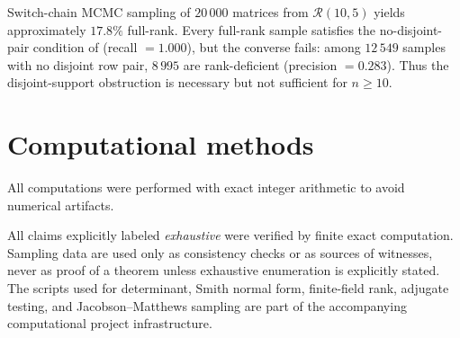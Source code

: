 \documentclass[11pt,a4paper]{article}
\begin{document}
\begin{remark}[Converse failure at $n=10$]\label{rem:n10-converse}
Switch-chain MCMC sampling of $20\,000$ matrices from $\mathcal{R}(10,5)$
yields approximately $17.8\%$ full-rank.  Every full-rank sample satisfies
the no-disjoint-pair condition of  (recall
$=1.000$), but the converse fails: among $12\,549$ samples with no
disjoint row pair, $8\,995$ are rank-deficient (precision $=0.283$).
Thus the disjoint-support obstruction is necessary but not sufficient
for $n\ge 10$.
\end{remark}

\section{Computational methods}\label{sec:computation}

All computations were performed with exact integer arithmetic to avoid
numerical artifacts.

All claims explicitly labeled \emph{exhaustive} were verified by finite
exact computation.  Sampling data are used only as consistency checks or
as sources of witnesses, never as proof of a theorem unless exhaustive
enumeration is explicitly stated.  The scripts used for determinant,
Smith normal form, finite-field rank, adjugate testing, and
Jacobson--Matthews sampling are part of the accompanying computational
project infrastructure.
\end{document}
